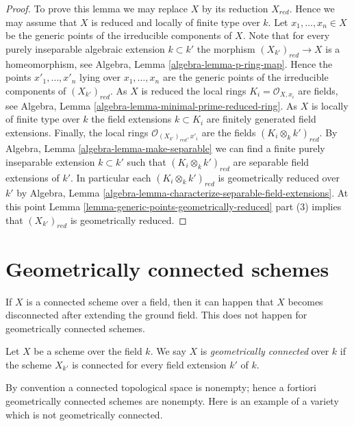 \begin{proof}
To prove this lemma we may replace $X$ by its reduction $X_{red}$.
Hence we may assume that $X$ is reduced and locally of finite type
over $k$.
Let $x_1, \ldots, x_n \in X$ be the generic points of the irreducible
components of $X$.
Note that for every purely inseparable algebraic extension $k \subset k'$
the morphism $(X_{k'})_{red} \to X$ is a homeomorphism, see
Algebra, Lemma \ref{algebra-lemma-p-ring-map}. Hence the points
$x'_1, \ldots, x'_n$ lying over $x_1, \ldots, x_n$ are the generic
points of the irreducible components of $(X_{k'})_{red}$.
As $X$ is reduced the local rings $K_i = \mathcal{O}_{X, x_i}$ are fields, see
Algebra, Lemma \ref{algebra-lemma-minimal-prime-reduced-ring}.
As $X$ is locally of finite type over $k$ the field extensions
$k \subset K_i$ are finitely generated field extensions.
Finally, the local rings $\mathcal{O}_{(X_{k'})_{red}, x'_i}$ are the
fields $(K_i \otimes_k k')_{red}$. By
Algebra, Lemma \ref{algebra-lemma-make-separable}
we can find a finite purely inseparable extension $k \subset k'$
such that $(K_i \otimes_k k')_{red}$ are separable field
extensions of $k'$. In particular each $(K_i \otimes_k k')_{red}$
is geometrically reduced over $k'$ by
Algebra, Lemma \ref{algebra-lemma-characterize-separable-field-extensions}.
At this point
Lemma \ref{lemma-generic-points-geometrically-reduced} part (3)
implies that $(X_{k'})_{red}$ is geometrically reduced.
\end{proof}






\section{Geometrically connected schemes}
\label{section-geometrically-connected}

\noindent
If $X$ is a connected scheme over a field, then it can happen that $X$
becomes disconnected after extending the ground field. This does not happen
for geometrically connected schemes.

\begin{definition}
\label{definition-geometrically-connected}
Let $X$ be a scheme over the field $k$. We say $X$ is
{\it geometrically connected} over $k$ if the scheme $X_{k'}$ is connected
for every field extension $k'$ of $k$.
\end{definition}

\noindent
By convention a connected topological space is nonempty; hence a fortiori
geometrically connected schemes are nonempty.
Here is an example of a variety which is not geometrically connected.

